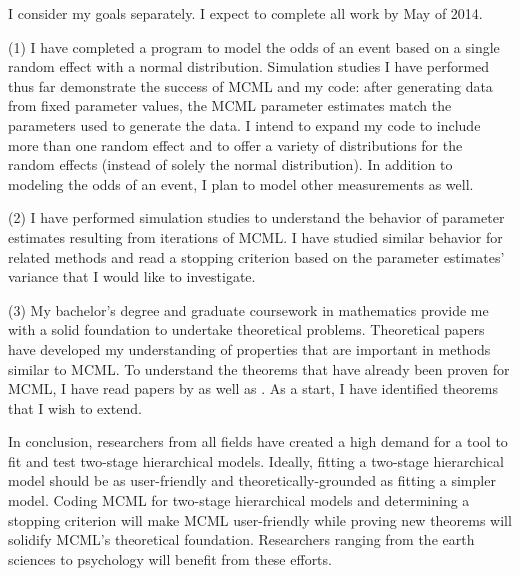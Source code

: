 \documentclass[12pt]{article}
\begin{document}

I consider my  goals separately. I expect to complete all work by May of 2014.


(1) I have completed a program to model the odds  of an event based on a single random effect with a normal distribution. Simulation studies I have performed thus far demonstrate the success of MCML and my code: after generating data from fixed parameter values, the MCML parameter estimates  match the  parameters used to generate the data. I intend to expand my code  to include more than one random effect and to offer a variety of distributions for the random effects (instead of solely the normal distribution). In addition to modeling the odds of an event, I plan to model other measurements as well. 

(2) I have performed simulation studies to understand the behavior of parameter estimates resulting from iterations of MCML. I have studied similar behavior for related methods and read  a stopping criterion based on the parameter estimates' variance that I would like to investigate.  

(3) My bachelor's degree and graduate coursework in mathematics provide me with a solid foundation to undertake  theoretical problems. Theoretical papers have developed my understanding of properties that are important in methods similar to MCML.  To understand the  theorems that have already been proven for MCML, I have read papers by \citet{geyer:1994} as well as \citet{sung:geyer:2007}. As a start, I have identified theorems that I wish to extend. 


In conclusion, researchers from all fields have created a high demand for a tool to fit and test two-stage hierarchical models. Ideally, fitting a two-stage hierarchical model should be as user-friendly and theoretically-grounded as fitting a simpler model. Coding MCML for two-stage hierarchical models and determining a stopping criterion will make MCML user-friendly while proving new theorems will solidify MCML's theoretical foundation. Researchers ranging from the earth sciences to psychology will benefit from these efforts.

\vspace{-2.3cm}
\renewcommand{\refname}{}


\end{document}
